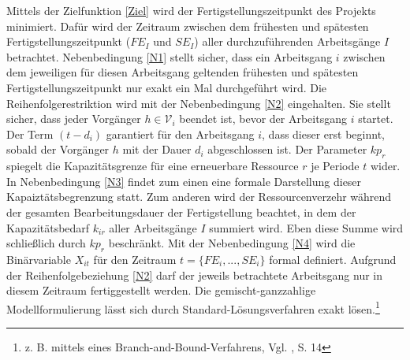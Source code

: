 \documentclass[a4paper,12pt,parskip,bibtotoc,liststotoc]{article}
\begin{document}
Mittels der Zielfunktion \eqref{Ziel} wird der Fertigstellungszeitpunkt des Projekts minimiert. Dafür wird der Zeitraum zwischen dem frühesten und spätesten Fertigstellungszeitpunkt ($FE_{I}$ und $SE_{I}$) aller durchzuführenden Arbeitsgänge $I$ betrachtet. Nebenbedingung \eqref{N1} stellt sicher, dass ein Arbeitsgang $i$ zwischen dem jeweiligen für diesen Arbeitsgang geltenden frühesten und spätesten Fertigstellungszeitpunkt nur exakt ein Mal durchgeführt wird. Die Reihenfolgerestriktion wird mit der Nebenbedingung \eqref{N2} eingehalten. Sie stellt sicher, dass jeder Vorgänger $h \in \mathcal{V}_{i}$ beendet ist, bevor der Arbeitsgang $i$ startet. Der Term $(t - d_{i})$ garantiert für den Arbeitsgang $i$, dass dieser erst beginnt, sobald der Vorgänger $h$ mit der Dauer $d_{i}$ abgeschlossen ist.
Der Parameter $kp_{r}$ spiegelt die Kapazitätsgrenze für eine erneuerbare Ressource $r$ je Periode $t$ wider. In Nebenbedingung \eqref{N3} findet zum einen eine formale Darstellung dieser Kapaiztätsbegrenzung statt. Zum anderen wird der Ressourcenverzehr während der gesamten Bearbeitungsdauer der Fertigstellung beachtet, in dem der Kapazitätsbedarf $k_{ir}$ aller Arbeitsgänge $I$ summiert wird. Eben diese Summe wird schließlich durch $kp_{r}$ beschränkt. %
Mit der Nebenbedingung \eqref{N4} wird die Binärvariable $X_{it}$ für den Zeitraum $t = \{FE_{i},...,SE_{i}\}$ formal definiert. Aufgrund der Reihenfolgebeziehung \eqref{N2} darf der jeweils betrachtete Arbeitsgang nur in diesem Zeitraum fertiggestellt werden.
Die gemischt-ganzzahlige Modellformulierung lässt sich durch Standard-Lösungsverfahren exakt lösen.\footnote{z. B. mittels eines Branch-and-Bound-Verfahrens, Vgl. \cite{kellenbrink2014einfuhrung}, S. 14}
\end{document}
